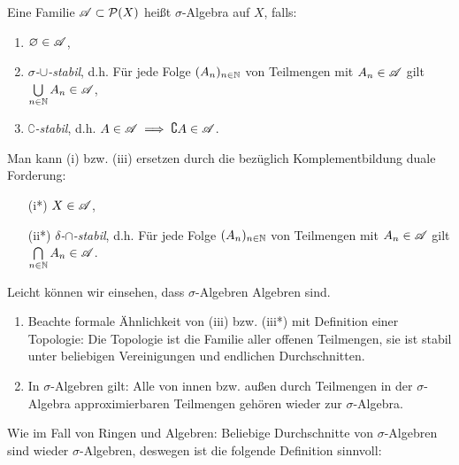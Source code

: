 \begin{definition}
\begin{mdframed}
Eine Familie $\AA\subset \mathcal{P}(X)$ heißt $\sigma$-Algebra auf $X$, falls:
\begin{enumerate}[(\roman*),topsep=5pt, itemsep = 0 pt]
	\item $\emptyset \in \AA$,
	\item \emph{$\sigma$-$\cup$-stabil}, d.h. Für jede Folge $(A_n)_{n\in \N}$ von Teilmengen mit $A_n \in \AA$ gilt $\bigcup\limits_{n\in\N} A_n \in \AA$,
	\item \emph{$\complement$-stabil}, d.h. $A \in \AA \implies \complement A \in \AA$.
\end{enumerate}
\end{mdframed}
Man kann (i) bzw. (iii) ersetzen durch die bezüglich Komplementbildung duale Forderung:
\begin{enumerate}[(\roman*),topsep=5pt, itemsep = 0 pt]
	\item[(i*)] $X \in \AA$,
	\item[(ii*)] \emph{$\delta$-$\cap$-stabil}, d.h. Für jede Folge $(A_n)_{n\in \N}$ von Teilmengen mit $A_n \in \AA$ gilt $\bigcap\limits_{n\in\N}A_n \in \AA$.
\end{enumerate}
Leicht können wir einsehen, dass $\sigma$-Algebren Algebren sind.
\begin{remark}
\begin{enumerate}[(\roman*),topsep=5pt, itemsep = 0 pt]
	\item Beachte formale Ähnlichkeit von (iii) bzw. (iii*) mit Definition einer Topologie: Die Topologie ist die Familie aller offenen Teilmengen, sie ist stabil unter beliebigen Vereinigungen und endlichen Durchschnitten.
	\item In $\sigma$-Algebren gilt: Alle von innen bzw. außen durch Teilmengen in der $\sigma$-Algebra approximierbaren Teilmengen gehören wieder zur $\sigma$-Algebra.
\end{enumerate}
\end{remark}
\end{definition}

Wie im Fall von Ringen und Algebren: Beliebige Durchschnitte von $\sigma$-Algebren sind wieder $\sigma$-Algebren, deswegen ist die folgende Definition sinnvoll:

